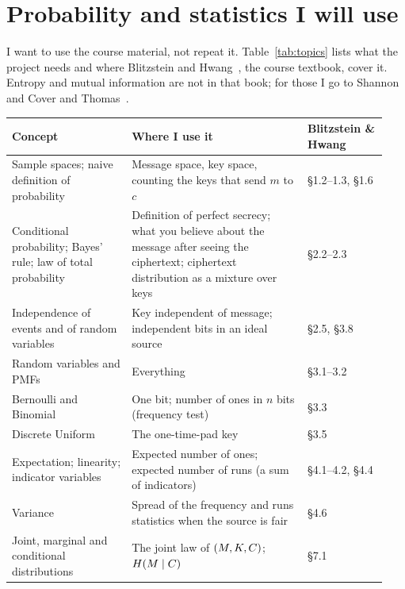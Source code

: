 \section{Probability and statistics I will use}\label{sec:topics}

I want to use the course material, not repeat it.
Table~\ref{tab:topics} lists what the project needs and where Blitzstein and
Hwang~\cite{blitzstein2015}, the course textbook, cover it. Entropy and
mutual information are not in that book; for those I go to
Shannon~\cite{shannon1948} and Cover and Thomas~\cite{cover2006}.

\begin{table}[htbp]
  \centering
  \small
  \begin{tabular}{@{}>{\raggedright\arraybackslash}p{0.30\linewidth}>{\raggedright\arraybackslash}p{0.44\linewidth}>{\raggedright\arraybackslash}p{0.20\linewidth}@{}}
    \toprule
    Concept & Where I use it & Blitzstein \& Hwang \\
    \midrule
    Sample spaces; naive definition of probability
      & Message space, key space, counting the keys that send $m$ to $c$
      & \S1.2--1.3, \S1.6 \\
    Conditional probability; Bayes' rule; law of total probability
      & Definition of perfect secrecy; what you believe about the message
        after seeing the ciphertext; ciphertext distribution as a mixture
        over keys
      & \S2.2--2.3 \\
    Independence of events and of random variables
      & Key independent of message; independent bits in an ideal source
      & \S2.5, \S3.8 \\
    Random variables and PMFs
      & Everything
      & \S3.1--3.2 \\
    Bernoulli and Binomial
      & One bit; number of ones in $n$ bits (frequency test)
      & \S3.3 \\
    Discrete Uniform
      & The one-time-pad key
      & \S3.5 \\
    Expectation; linearity; indicator variables
      & Expected number of ones; expected number of runs (a sum of
        indicators)
      & \S4.1--4.2, \S4.4 \\
    Variance
      & Spread of the frequency and runs statistics when the source is fair
      & \S4.6 \\
    Joint, marginal and conditional distributions
      & The joint law of $(M, K, C)$; $H\!\left(M \mid C\right)$
      & \S7.1 \\

\end{tabular}
\end{table}

